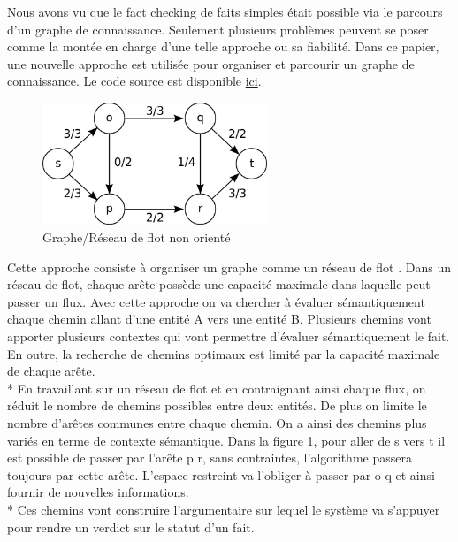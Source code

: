 Nous avons vu que le fact checking de faits simples était possible via le parcours d'un graphe de connaissance. Seulement plusieurs problèmes peuvent se poser comme la montée en charge d'une telle approche ou sa fiabilité. Dans ce papier, une nouvelle approche est utilisée pour organiser et parcourir un graphe de connaissance. Le code source est disponible \href{https://github.com/shiralkarprashant/knowledgestream}{ici}.

\begin{figure}
  \begin{center}
    \includegraphics[width=0.6\textwidth]{imgs/max_flow.png}
  \end{center}
  \caption{Graphe/Réseau de flot non orienté}
  \label{max_flow}
\end{figure}

Cette approche consiste à organiser un graphe comme un réseau de flot \cite{shiralkar2017finding}. Dans un réseau de flot, chaque arête possède une capacité maximale dans laquelle peut passer un flux. Avec cette approche on va chercher à évaluer sémantiquement chaque chemin allant d'une entité A vers une entité B. Plusieurs chemins vont apporter plusieurs contextes qui vont permettre d'évaluer sémantiquement le fait. En outre, la recherche de chemins optimaux est limité par la capacité maximale de chaque arête. 
\\*
En travaillant sur un réseau de flot et en contraignant ainsi chaque flux, on réduit le nombre de chemins possibles entre deux entités. De plus on limite le nombre d'arêtes communes entre chaque chemin. On a ainsi des chemins plus variés en terme de contexte sémantique. Dans la figure \ref{max_flow}, pour aller de s vers t il est possible de passer par l'arête p \textrightarrow r, sans contraintes, l'algorithme passera toujours par cette arête. L'espace restreint va l'obliger à passer par o \textrightarrow q et ainsi fournir de nouvelles informations.
\\*
Ces chemins vont construire l'argumentaire sur lequel le système va s'appuyer pour rendre un verdict sur le statut d'un fait.

